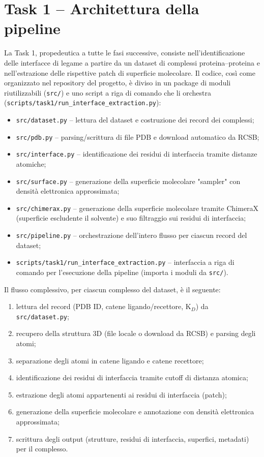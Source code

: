 \documentclass[11pt,a4paper]{article}
\begin{document}
\section{Task 1 -- Architettura della pipeline}
\label{sec:task1}
La Task 1, propedeutica a tutte le fasi successive, consiste nell'identificazione delle interfacce di legame a partire da un dataset di complessi proteina--proteina e nell'estrazione delle rispettive patch di superficie molecolare. Il codice, così come organizzato nel repository del progetto, è diviso in un package di moduli riutilizzabili (\texttt{src/}) e uno script a riga di comando che li orchestra (\texttt{scripts/task1/run\_interface\_extraction.py}):

\begin{itemize}
    \item \texttt{src/dataset.py} -- lettura del dataset e costruzione dei record dei complessi;
    \item \texttt{src/pdb.py} -- parsing/scrittura di file PDB e download automatico da RCSB;
    \item \texttt{src/interface.py} -- identificazione dei residui di interfaccia tramite distanze atomiche;
    \item \texttt{src/surface.py} -- generazione della superficie molecolare "sampler" con densità elettronica approssimata;
    \item \texttt{src/chimerax.py} -- generazione della superficie molecolare tramite ChimeraX (superficie escludente il solvente) e suo filtraggio sui residui di interfaccia;
    \item \texttt{src/pipeline.py} -- orchestrazione dell'intero flusso per ciascun record del dataset;
    \item \texttt{scripts/task1/run\_interface\_extraction.py} -- interfaccia a riga di comando per l'esecuzione della pipeline (importa i moduli da \texttt{src/}).
\end{itemize}

Il flusso complessivo, per ciascun complesso del dataset, è il seguente:
\begin{enumerate}
    \item lettura del record (PDB ID, catene ligando/recettore, K$_D$) da \texttt{src/dataset.py};
    \item recupero della struttura 3D (file locale o download da RCSB) e parsing degli atomi;
    \item separazione degli atomi in catene ligando e catene recettore;
    \item identificazione dei residui di interfaccia tramite cutoff di distanza atomica;
    \item estrazione degli atomi appartenenti ai residui di interfaccia (patch);
    \item generazione della superficie molecolare e annotazione con densità elettronica approssimata;
    \item scrittura degli output (strutture, residui di interfaccia, superfici, metadati) per il complesso.
\end{enumerate}
\end{document}

